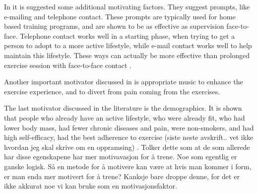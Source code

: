 In \cite{schutzer} it is suggested some additional motivating factors. They suggest prompts, like e-mailing and telephone contact. These prompts are typically used for home based training programs, and are shown to be as effective as supervision face-to-face. Telephone contact works well in a starting phase, when trying to get a person to adopt to a more active lifestyle, while e-mail contact works well to help maintain this lifestyle. These ways can actually be more effective than prolonged exercise session with face-to-face contact \cite{schutzer}. 

Another important motivator discussed in \cite{schutzer} is appropriate music to enhance the exercise experience, and to divert from pain coming from the exercises. 

The last motivator discussed in the literature is the demographics. It is shown that people who already have an active lifestyle, who were already fit, who had lower body mass, had fewer chronic diseases and pain, were non-smokers, and had high self-efficacy, had the best adherence to exercise (siste neste avskrift.. vet ikke hvordan jeg skal skrive om en oppramsing) \cite{schutzer}. Tolker dette som at de som allerede har disse egenskapene har mer motivavasjon for å trene. Noe som egentlig er ganske logisk. Så en metode for å motivere kan være at hvis man kommer i form, er man enda mer motivert for å trene? Kanksje bare droppe denne, for det er ikke akkurat noe vi kan bruke som en motivasjonsfaktor. 



